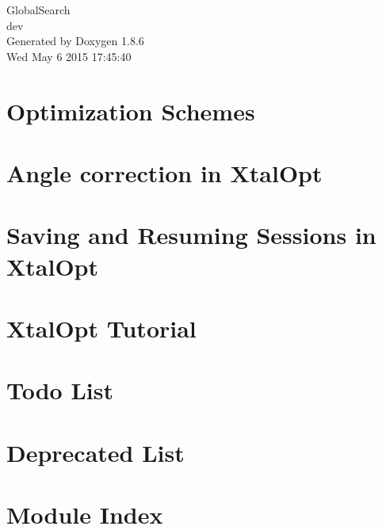 \documentclass[twoside]{book}
\newcommand{\clearemptydoublepage}{%
  \newpage{\pagestyle{empty}\cleardoublepage}%
}
\begin{document}
\hypersetup{pageanchor=false}
\begin{titlepage}
\vspace*{7cm}
\begin{center}%
{\Large Global\-Search \\[1ex]\large dev }\\
\vspace*{1cm}
{\large Generated by Doxygen 1.8.6}\\
\vspace*{0.5cm}
{\small Wed May 6 2015 17:45:40}\\
\end{center}
\end{titlepage}
\clearemptydoublepage
\tableofcontents
\clearemptydoublepage
{}
\hypersetup{pageanchor=true}

\chapter{Optimization Schemes}
\label{optschemes}
\hypertarget{optschemes}{}

\chapter{Angle correction in Xtal\-Opt}
\label{fixAngles}
\hypertarget{fixAngles}{}

\chapter{Saving and Resuming Sessions in Xtal\-Opt}
\label{xo_saveresume}
\hypertarget{xo_saveresume}{}

\chapter{Xtal\-Opt Tutorial}
\label{tut-xo}
\hypertarget{tut-xo}{}

\chapter{Todo List}
\label{todo}
\hypertarget{todo}{}

\chapter{Deprecated List}
\label{deprecated}
\hypertarget{deprecated}{}

\chapter{Module Index}

\end{document}
